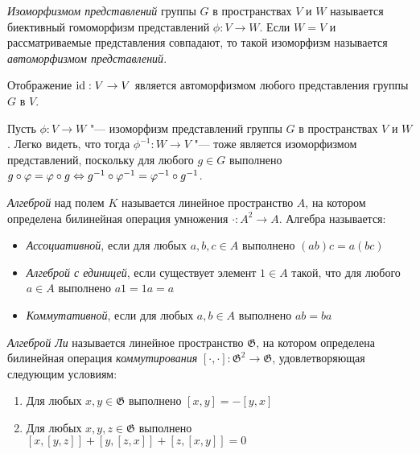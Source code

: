 \begin{definition}
	\textit{Изоморфизмом представлений} группы $G$ в пространствах $V$ и $W$ называется биективный гомоморфизм представлений $\phi : V \to W$. Если $W = V$ и рассматриваемые представления совпадают, то такой изоморфизм называется \textit{автоморфизмом представлений}.
\end{definition}

\begin{example}
	Отображение $\mathrm{id} : V \to V$ является автоморфизмом любого представления группы $G$ в $V$.
\end{example}

\begin{note}
	Пусть $\phi : V \to W$ "--- изоморфизм представлений группы $G$ в пространствах $V$ и $W$. Легко видеть, что тогда $\phi^{-1} : W \to V$ "--- тоже является изоморфизмом представлений, поскольку для любого $g \in G$ выполнено $g\circ\varphi = \varphi \circ g \Leftrightarrow g^{-1}\circ\varphi^{-1} = \varphi^{-1}\circ g^{-1}$.
\end{note}

\begin{definition}
	\textit{Алгеброй} над полем $K$ называется линейное пространство $A$, на котором определена билинейная операция умножения $\cdot : A^2 \to A$. Алгебра называется:
	\begin{itemize}
		\item \textit{Ассоциативной}, если для любых $a, b, c \in A$ выполнено $(ab)c = a(bc)$
		\item \textit{Алгеброй с единицей}, если существует элемент $1 \in A$ такой, что для любого $a \in A$ выполнено $a1 = 1a = a$
		\item \textit{Коммутативной}, если для любых $a, b \in A$ выполнено $ab = ba$
	\end{itemize}
\end{definition}

\begin{definition}
	\textit{Алгеброй Ли} называется линейное пространство $\mathfrak G$, на котором определена билинейная операция \textit{коммутирования} $[\cdot,\cdot] : \mathfrak G^2 \to \mathfrak G$, удовлетворяющая следующим условиям:
	\begin{enumerate}
		\item Для любых $x, y \in \mathfrak G$ выполнено $[x, y] = -[y, x]$
		\item Для любых $x, y, z \in \mathfrak G$ выполнено $[x, [y, z]] + [y, [z, x]] + [z, [x, y]] = 0$
	\end{enumerate}
\end{definition}


